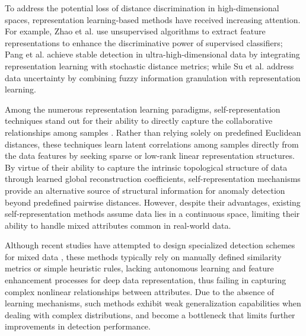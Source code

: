 \documentclass[ASNA,twocolumn]{USG} %
\begin{document}
To address the potential loss of distance discrimination in high-dimensional spaces, representation learning-based methods have received increasing attention. For example, Zhao et al. \cite{zhao2018xgbod} use unsupervised algorithms to extract feature representations to enhance the discriminative power of supervised classifiers; Pang et al. \cite{pang2018learning} achieve stable detection in ultra-high-dimensional data by integrating representation learning with stochastic distance metrics; while Su et al. \cite{su2026outlier} address data uncertainty by combining fuzzy information granulation with representation learning. 

Among the numerous representation learning paradigms, self-representation techniques stand out for their ability to directly capture the collaborative relationships among samples \cite{quan2025class}. Rather than relying solely on predefined Euclidean distances, these techniques learn latent correlations among samples directly from the data features by seeking sparse or low-rank linear representation structures. By virtue of their ability to capture the intrinsic topological structure of data through learned global reconstruction coefficients, self-representation mechanisms provide an alternative source of structural information for anomaly detection beyond predefined pairwise distances.
However, despite their advantages, existing self-representation methods assume data lies in a continuous space, limiting their ability to handle mixed attributes common in real-world data.

Although recent studies have attempted to design specialized detection schemes for mixed data \cite{yuan2023anomaly}, these methods typically rely on manually defined similarity metrics or simple heuristic rules, lacking autonomous learning and feature enhancement processes for deep data representation, thus failing in capturing complex nonlinear relationships between attributes. Due to the absence of learning mechanisms, such methods exhibit weak generalization capabilities when dealing with complex distributions, and become a bottleneck that limits further improvements in detection performance.
\end{document}
